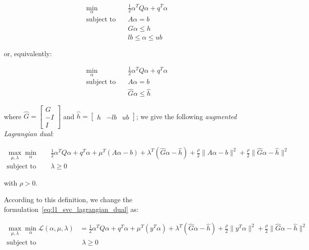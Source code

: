 \begin{equation}
    \begin{aligned} 
        \min_{\alpha} \quad & \frac{1}{2} \alpha^T Q \alpha + q^T \alpha \\
            \textrm{subject to} \quad & A \alpha = b \\ & G \alpha \leq h \\ & lb \leq \alpha \leq ub
    \end{aligned}
\end{equation}

or, equivalently:

\begin{equation}
    \begin{aligned}
        \min_{\alpha} \quad & \frac{1}{2} \alpha^T Q \alpha + q^T \alpha \\
            \textrm{subject to} \quad & A \alpha = b \\ & \hat{G} \alpha \leq \hat{h}
    \end{aligned}
\end{equation}

where $\hat{G} =
\begin{bmatrix}
 G \\
-I \\
 I 
\end{bmatrix}$ and $\hat{h} =
\begin{bmatrix}
h & -lb & ub
\end{bmatrix}$; we give the following \emph{augmented Lagrangian dual}:

\begin{equation} \label{eq:svc_gen_aug_lagrangian_dual}
	\begin{aligned}
		    \max_{\mu,\lambda} \min_{\alpha} \quad & \frac{1}{2} \alpha^T Q \alpha + q^T \alpha + \mu^T (A \alpha - b) + \lambda^T (\hat{G} \alpha - \hat{h}) + \frac{\rho}{2} \| A \alpha - b \|^2 + \frac{\rho}{2} \| \hat{G} \alpha - \hat{h} \|^2 \\
    \text{subject to} \quad & \lambda \geq 0
	\end{aligned}
\end{equation}

with $\rho > 0$.

\bigskip

According to this definition, we change the formulation~\ref{eq:l1_svc_lagrangian_dual} as:

\begin{equation} \label{eq:l1_svc_aug_lagrangian_dual}
	\begin{aligned}
		    \max_{\mu,\lambda} \min_{\alpha} \mathcal{L}(\alpha,\mu,\lambda) &= \frac{1}{2} \alpha^T Q\alpha+q^T\alpha + \mu^T (y^T \alpha) + \lambda^T (\hat{G} \alpha - \hat{h}) + \frac{\rho}{2} \| y^T \alpha \|^2 + \frac{\rho}{2} \| \hat{G} \alpha - \hat{h} \|^2 \\
    \text{subject to} \quad & \,\, \lambda \geq 0
	\end{aligned}
\end{equation}

